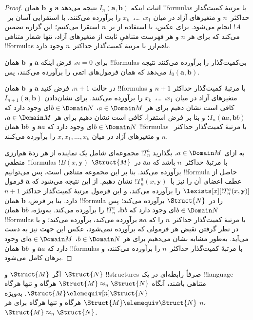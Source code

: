 \documentclass[../../../include/open-logic-section]{subfiles}
\begin{document}
\begin{proof}
  اثبات اینکه $I_n(\mathbf{a},\mathbf{b})$ نتیجه می‌دهد
  $\mathbf{a}$ و~$\mathbf{b}$ همان !!{formula}s با مرتبهٔ کمیت‌گذار
  حداکثر~$n$ و متغیرهای آزاد در میان $x_1$، \dots،~$x_k$ را برآورده
  می‌کنند، با استقرایی آسان بر~$!A$ انجام می‌شود. برای عکس، با استفاده
  از  بر~$n$ استقرا می‌کنیم؛ این گزاره تضمین
  می‌کند که برای هر $n$ و هر فهرست متناهیِ ثابت از متغیرهای آزاد، تنها
  شمار متناهی !!{formula}s ناهم‌ارز با مرتبهٔ کمیت‌گذار حداکثر~$n$
  وجود دارد.

  برای $n=0$، فرض اینکه $\mathbf{a}$ و~$\mathbf{b}$ همان
  !!{formula}s بی‌کمیت‌گذار را برآورده می‌کنند نتیجه می‌دهد که همان
  فرمول‌های اتمی را برآورده می‌کنند، پس
  $I_0(\mathbf{a},\mathbf{b})$.

  در حالت $n+1$، فرض کنید $\mathbf{a}$ و~$\mathbf{b}$ همان
  !!{formula}s با مرتبهٔ کمیت‌گذار حداکثر $n+1$ و متغیرهای آزاد در
  میان $x_1$، \dots،~$x_k$ را برآورده می‌کنند. برای نشان‌دادن
  $I_{n+1}(\mathbf{a},\mathbf{b})$ کافی است نشان دهیم برای هر
  $a \in \Domain M$، $b \in \Domain N$ای وجود دارد که
  $I_n(\mathbf{a}a,\mathbf{b}b)$؛ و بنا بر فرض استقرا، کافی است نشان
  دهیم برای هر $a \in \Domain M$، $b \in \Domain N$ای وجود دارد که
  $\mathbf{a}a$ و~$\mathbf{b}b$ همان !!{formula}s با مرتبهٔ کمیت‌گذار
  حداکثر~$n$ و متغیرهای آزاد در میان $x,x_1,\dots,x_k$ را برآورده
  می‌کنند.

  به ازای $a \in \Domain M$، بگذارید $!T^a_n$ مجموعه‌ای شامل یک
  نماینده از هر ردهٔ هم‌ارزی منطقیِ !!{formula}s
  $!B(x,\mathbf{y})$ با مرتبهٔ حداکثر~$n$ باشد که
  $\mathbf{a}a$ در~$\Struct{M}$ برآورده می‌کند. بنا بر
   این مجموعه متناهی است، پس می‌توانیم !!{formula}
  حاصل از عطف اعضای آن را نیز با~$!T^a_n(x,\mathbf y)$ نشان دهیم. از
  این نتیجه می‌شود که
  $\mathbf{a}$ فرمول $\lexists[x][!T^a_n(x,\mathbf{y})]$ را برآورده
  می‌کند، و این فرمول مرتبهٔ کمیت‌گذار حداکثر $n+1$ دارد. بنا بر فرض،
  $\mathbf{b}$ همان !!{formula} را در~$\Struct{N}$ برآورده می‌کند؛ پس
  $b \in \Domain N$ای وجود دارد که $\mathbf{b}b$، $!T^a_n$ را
  برآورده می‌کند. به‌ویژه، $\mathbf{b}b$ همان !!{formula}s با مرتبهٔ
  کمیت‌گذار حداکثر~$n$ را که $\mathbf{a}a$ برآورده می‌کند، برآورده
  می‌کند؛ و با در نظر گرفتن نقیض هر فرمولی که برآورده نمی‌شود، عکس این
  جهت نیز به دست می‌آید. به‌طور مشابه نشان می‌دهیم برای هر
  $b \in \Domain N$، $a\in \Domain M$ای وجود دارد که
  $\mathbf{a}a$ و~$\mathbf{b}b$ همان !!{formula}s با مرتبهٔ
  کمیت‌گذار حداکثر~$n$ را برآورده می‌کنند، و برهان کامل می‌شود.
\end{proof}

\begin{cor}
  اگر $\Struct{M}$ و~$\Struct{N}$ !!{structure}s صرفاً رابطه‌ای در یک
  !!{language} متناهی باشند، آنگاه
  $\Struct{M} \approx_n\Struct{N}$ هرگاه و تنها هرگاه
  $\Struct{M} \elemequiv[n] \Struct{N}$. به‌ویژه
  $\Struct{M} \elemequiv \Struct{N}$ هرگاه و تنها هرگاه برای هر $n$،
  $\Struct{M} \approx_n \Struct{N}$.
\end{cor}
\end{document}
